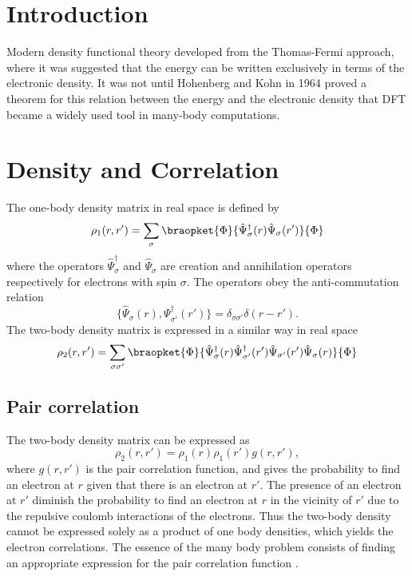 \documentclass[a4paper,10pt,english]{article}%
\begin{document}
\section{Introduction}
Modern density functional theory developed from the Thomas-Fermi approach, where
it was suggested that the energy can be written exclusively in terms of the 
electronic density. It was not until Hohenberg and Kohn in 1964 proved a theorem
for this relation between the energy and the electronic density that DFT became
a widely used tool in many-body computations.

\section{Density and Correlation}
The one-body density matrix in real space is defined by
\begin{equation}
  \rho_1(r,r')=\sum_{\sigma}\braopket{\Phi}{\hat\Psi_{\sigma}^\dagger(r)\hat\Psi_\sigma(r')}{\Phi}
  \label{sdeq:onedens}
\end{equation}
where the operators $\hat\Psi^\dagger_{\sigma}$ and $\hat\Psi_{\sigma}$ are creation and
annihilation operators respectively for electrons with spin $\sigma$. The 
operators obey the anti-commutation relation
\begin{equation}
  \{\hat\Psi_{\sigma}(r),\Psi_{\sigma'}^\dagger(r')\}=\delta_{\sigma\sigma'}\delta(r-r').
  \label{sdeq:anticumm}
\end{equation}
The two-body density matrix is expressed in a similar way in real space
\begin{equation}
  \rho_2(r,r')=\sum_{\sigma \sigma'}\braopket{\Phi}{\hat\Psi_{\sigma}^\dagger(r)\hat\Psi_{\sigma'}^\dagger(r')\hat\Psi_{\sigma'}(r')\hat\Psi_\sigma(r)}{\Phi}
  \label{sdeq:twodens}
\end{equation}

\subsection{Pair correlation}
The two-body density matrix can be expressed as 
\begin{equation}
  \rho_2(r,r')=\rho_1(r)\rho_1(r')g(r,r'),
  \label{sseq:twodenscorr}
\end{equation}
where $g(r,r')$ is the pair correlation function, and gives the probability
to find an electron at $r$ given that there is an electron at $r'$. The
presence of an electron at $r'$ diminish the probability to find an electron
at $r$ in the vicinity of $r'$ due to the repulsive coulomb interactions of the
electrons. Thus the two-body density cannot be expressed solely as a 
product of one body densities, which yields the electron correlations.
The essence of the many body problem consists of finding an appropriate expression for the pair correlation function \cite{kohanoff2006}.\\
\end{document}
